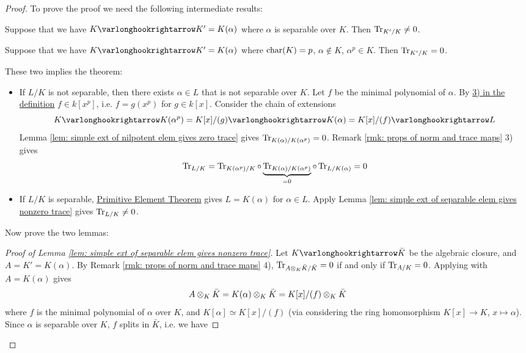 \begin{proof}
    To prove the proof we need the following intermediate results:
    \begin{lemma}\label{lem: simple ext of separable elem gives nonzero trace}
        Suppose that we have $K \ext K' = K(\alpha)$ where $\alpha$ is separable over $K$. Then $\operatorname{Tr}_{K'/K} \neq 0$.
    \end{lemma}
    \nogap
    \begin{lemma}\label{lem: simple ext of nilpotent elem gives zero trace}
        Suppose that we have $K \ext K' = K(\alpha)$ where $\mathrm{char}(K) = p$, $\alpha \notin K$, $\alpha^p \in K$. Then $\operatorname{Tr}_{K'/K} = 0$.
    \end{lemma}
    These two implies the theorem:
    \begin{itemize}
        \item If $L/K$ is not separable, then there exists $\alpha \in L$ that is not separable over $K$. Let $f$ be the minimal polynomial of $\alpha$. By \hyperref[def: separable extension]{3) in the definition} $f \in k[x^p]$, i.e. $f = g(x^p)$ for $g \in k[x]$. Consider the chain of extensions
        \[
            K \ext K(\alpha^p) = K[x]/(g) \ext K(\alpha) = K[x]/(f) \ext L
        \]
        Lemma \ref{lem: simple ext of nilpotent elem gives zero trace} gives $\operatorname{Tr}_{K(\alpha)/K(\alpha^p)} = 0$. Remark \ref{rmk: props of norm and trace maps} 3) gives 
        \[
            \operatorname{Tr}_{L/K} = \operatorname{Tr}_{K(\alpha^p)/K} \circ \underbrace{\operatorname{Tr}_{K(\alpha)/K(\alpha^p)}}_{= 0} \circ \operatorname{Tr}_{L/K(\alpha)} = 0
        \]
        \item If $L/K$ is separable, \hyperref[thm: primitive element theorem]{Primitive Element Theorem} gives $L = K(\alpha)$ for $\alpha \in L$. Apply Lemma \ref{lem: simple ext of separable elem gives nonzero trace} gives $\operatorname{Tr}_{L/K} \neq 0$.
    \end{itemize}
    Now prove the two lemmas:
    \begin{proof}[Proof of Lemma \ref{lem: simple ext of separable elem gives nonzero trace}]
        Let $K \ext \bar{K}$ be the algebraic closure, and $A = K' = K(\alpha)$. By Remark \ref{rmk: props of norm and trace maps} 4), $\operatorname{Tr}_{A \otimes_K \bar{K}/\bar{K}} = 0$ if and only if $\operatorname{Tr}_{A/K} = 0$. Applying with $A = K(\alpha)$ gives
        \[
            A \otimes_K \bar{K} = K(\alpha) \otimes_K \bar{K} = K[x]/(f) \otimes_K\bar{K}
        \]
        where $f$ is the minimal polynomial of $\alpha$ over $K$, and $K[\alpha] \simeq K[x]/(f)$ (via considering the ring homomorphism $K[x] \to K$, $x \mapsto \alpha$). Since $\alpha$ is separable over $K$, $f$ splits in $\bar{K}$, i.e. we have

\end{proof}
\end{proof}

